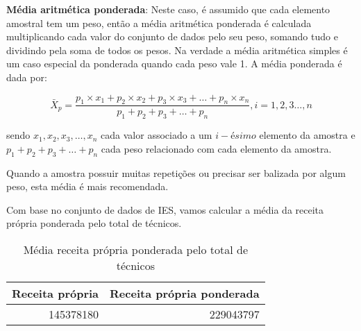\documentclass[12pt,]{style/krantz}
\makeatletter
\newenvironment{Shaded}{\begin{snugshade}}{\end{snugshade}}
\newcommand{\KeywordTok}[1]{\textcolor[rgb]{0.13,0.29,0.53}{\textbf{#1}}}
\newcommand{\DataTypeTok}[1]{\textcolor[rgb]{0.13,0.29,0.53}{#1}}
\newcommand{\StringTok}[1]{\textcolor[rgb]{0.31,0.60,0.02}{#1}}
\newcommand{\OperatorTok}[1]{\textcolor[rgb]{0.81,0.36,0.00}{\textbf{#1}}}
\newcommand{\NormalTok}[1]{#1}
\renewenvironment{quote}{\begin{VF}}{\end{VF}}
\newenvironment{kframe}{%
\medskip{}
\setlength{\fboxsep}{.8em}
 \def\at@end@of@kframe{}%
 \ifinner\ifhmode%
  \def\at@end@of@kframe{\end{minipage}}%
  \begin{minipage}{\columnwidth}%
 \fi\fi%
 \def\FrameCommand##1{\hskip\@totalleftmargin \hskip-\fboxsep
 \colorbox{shadecolor}{##1}\hskip-\fboxsep
     \hskip-\linewidth \hskip-\@totalleftmargin \hskip\columnwidth}%
 \MakeFramed {\advance\hsize-\width
   \@totalleftmargin\z@ \linewidth\hsize
   \@setminipage}}%
 {\par\unskip\endMakeFramed%
 \at@end@of@kframe}
\renewenvironment{Shaded}{\begin{kframe}}{\end{kframe}}
\theoremstyle{definition}
\theoremstyle{definition}
\theoremstyle{definition}
\theoremstyle{remark}
\let\BeginKnitrBlock\begin \let\EndKnitrBlock\end
\makeatother
\begin{document}
\textbf{Média aritmética ponderada}: Neste caso, é assumido que cada
elemento amostral tem um peso, então a média aritmética ponderada é
calculada multiplicando cada valor do conjunto de dados pelo seu peso,
somando tudo e dividindo pela soma de todos os pesos. Na verdade a média
aritmética simples é um caso especial da ponderada quando cada peso vale
1. A média ponderada é dada por:

\[\bar X_p = \frac{p_1 \times x_1 + p_2 \times x_2 + p_3\times  x_3 + \dots + p_n \times x_n}{p_1 + p_2 + p_3 + \dots + p_n}, i = 1, 2,3 \dots, n\]

sendo \(x_1, x_2, x_3, \dots , x_n\) cada valor associado a um
\(i-ésimo\) elemento da amostra e \(p_1 + p_2 + p_3 + \dots + p_n\) cada
peso relacionado com cada elemento da amostra.

\begin{quote}
Quando a amostra possuir muitas repetições ou precisar ser balizada por
algum peso, esta média é mais recomendada.
\end{quote}

\BeginKnitrBlock{example}
\protect\hypertarget{exm:unnamed-chunk-51}{}{\label{exm:unnamed-chunk-51}
}Com base no conjunto de dados de IES, vamos calcular a média da receita
própria ponderada pelo total de técnicos.
\EndKnitrBlock{example}

\begin{Shaded}
\end{Shaded}

\begin{table}[!h]

\caption{\label{tab:tab07}Média receita própria ponderada pelo total de técnicos}
\centering
\begin{tabular}{r|r}
\hline
Receita própria & Receita própria ponderada\\
\hline
145378180 & 229043797\\
\hline
\end{tabular}
\end{table}
\end{document}
